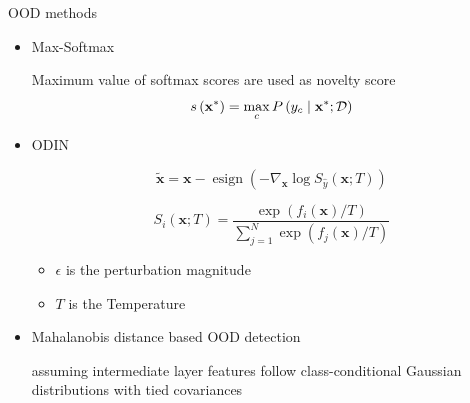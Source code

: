 \documentclass[10pt, aspectratio=169]{beamer}
\begin{document}
\begin{frame}[allowframebreaks]{OOD methods}
    \begin{itemize}
        \item Max-Softmax
        
        Maximum value of softmax scores are used as novelty score
        \begin{equation}
            \setlength{\jot}{10pt}
                s\left(\mathbf{x}^{*}\right)=\max _{c} P\left(y_{c} \mid \mathbf{x}^{*} ; \mathcal{D}\right)
                \label{softmax_score}
        \end{equation}

        \item ODIN
        
        \begin{equation}
            \tilde{\boldsymbol{x}}=\boldsymbol{x}-\operatorname{esign}\left(-\nabla_{\boldsymbol{x}} \log S_{\hat{y}}(\boldsymbol{x} ; T)\right)
            \label{perturbation}
        \end{equation}

        \begin{equation}
            S_{i}(\boldsymbol{x} ; T)=\frac{\exp \left(f_{i}(\boldsymbol{x}) / T\right)}{\sum_{j=1}^{N} \exp \left(f_{j}(\boldsymbol{x}) / T\right)}
            \label{ODIN_Softmaxscore}
        \end{equation}

        \begin{itemize}
            \item $\epsilon$ is the perturbation magnitude
            \item $T$ is the Temperature
        \end{itemize}
        
        \newpage
        
        \item Mahalanobis distance based OOD detection
        
        assuming intermediate layer features follow class-conditional Gaussian distributions with tied covariances



\end{itemize}
\end{frame}
\end{document}
